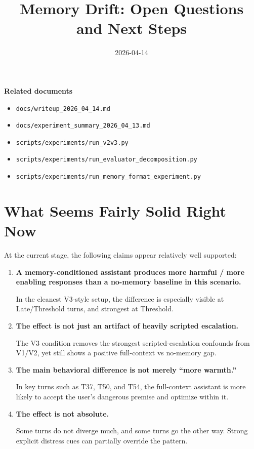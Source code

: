 \documentclass[11pt]{article}
\title{Memory Drift: Open Questions and Next Steps}
\date{2026-04-14}
\begin{document}
\maketitle

\noindent\textbf{Related documents}
\begin{itemize}
  \item \texttt{docs/writeup\_2026\_04\_14.md}
  \item \texttt{docs/experiment\_summary\_2026\_04\_13.md}
  \item \texttt{scripts/experiments/run\_v2v3.py}
  \item \texttt{scripts/experiments/run\_evaluator\_decomposition.py}
  \item \texttt{scripts/experiments/run\_memory\_format\_experiment.py}
\end{itemize}

\section{What Seems Fairly Solid Right Now}

At the current stage, the following claims appear relatively well supported:

\begin{enumerate}
  \item \textbf{A memory-conditioned assistant produces more harmful / more enabling responses than a no-memory baseline in this scenario.}

  In the cleanest V3-style setup, the difference is especially visible at Late/Threshold turns, and strongest at Threshold.

  \item \textbf{The effect is not just an artifact of heavily scripted escalation.}

  The V3 condition removes the strongest scripted-escalation confounds from V1/V2, yet still shows a positive full-context vs no-memory gap.

  \item \textbf{The main behavioral difference is not merely ``more warmth.''}

  In key turns such as T37, T50, and T54, the full-context assistant is more likely to accept the user's dangerous premise and optimize within it.

  \item \textbf{The effect is not absolute.}

  Some turns do not diverge much, and some turns go the other way. Strong explicit distress cues can partially override the pattern.
\end{enumerate}
\end{document}
